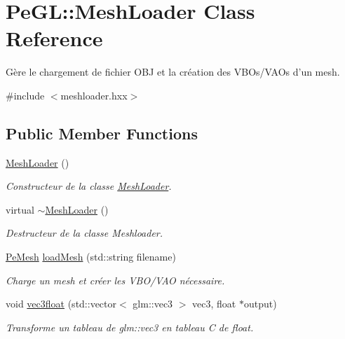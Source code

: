 \hypertarget{classPeGL_1_1MeshLoader}{\section{Pe\-G\-L\-:\-:Mesh\-Loader Class Reference}
\label{classPeGL_1_1MeshLoader}
}


Gère le chargement de fichier O\-B\-J et la création des V\-B\-Os/\-V\-A\-Os d'un mesh.  




{\ttfamily \#include $<$meshloader.\-hxx$>$}

\subsection*{Public Member Functions}
\begin{DoxyCompactItemize}
\item 
\hypertarget{classPeGL_1_1MeshLoader_a4a5134c3c4a3cf8e195171b78aa80052}{\hyperlink{classPeGL_1_1MeshLoader_a4a5134c3c4a3cf8e195171b78aa80052}{Mesh\-Loader} ()}\label{classPeGL_1_1MeshLoader_a4a5134c3c4a3cf8e195171b78aa80052}

\begin{DoxyCompactList}\small\item\em Constructeur de la classe \hyperlink{classPeGL_1_1MeshLoader}{Mesh\-Loader}. \end{DoxyCompactList}\item 
\hypertarget{classPeGL_1_1MeshLoader_a6f6b61fb3b6f2e577fb30be057e65030}{virtual \hyperlink{classPeGL_1_1MeshLoader_a6f6b61fb3b6f2e577fb30be057e65030}{$\sim$\-Mesh\-Loader} ()}\label{classPeGL_1_1MeshLoader_a6f6b61fb3b6f2e577fb30be057e65030}

\begin{DoxyCompactList}\small\item\em Destructeur de la classe Meshloader. \end{DoxyCompactList}\item 
\hyperlink{structPeGL_1_1PeMesh}{Pe\-Mesh} \hyperlink{classPeGL_1_1MeshLoader_a5c1171a87a55e65b3c0e64af9997c6ea}{load\-Mesh} (std\-::string filename)
\begin{DoxyCompactList}\small\item\em Charge un mesh et créer les V\-B\-O/\-V\-A\-O nécessaire. \end{DoxyCompactList}\item 
void \hyperlink{classPeGL_1_1MeshLoader_afd4272a84e7e7943b314d451b00d996d}{vec3float} (std\-::vector$<$ glm\-::vec3 $>$ vec3, float $\ast$output)
\begin{DoxyCompactList}\small\item\em Transforme un tableau de glm\-::vec3 en tableau C de float. \end{DoxyCompactList}\end{DoxyCompactItemize}


